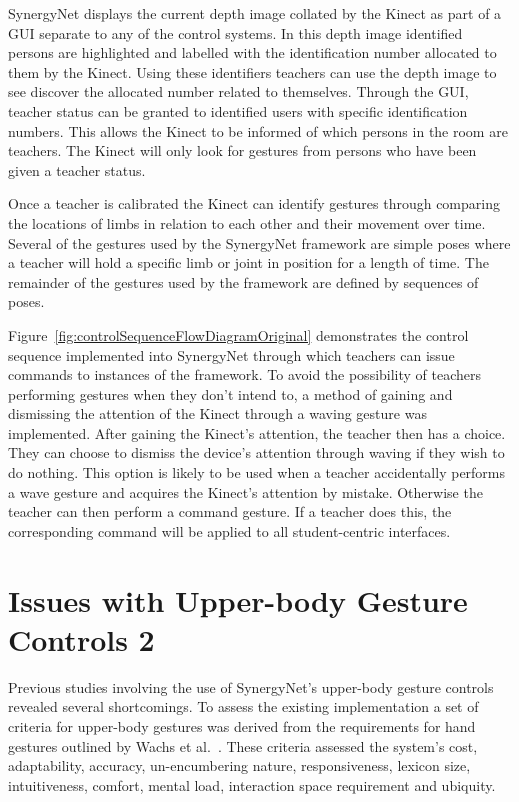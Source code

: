 \documentclass[manuscript, review, screen]{acmart}
\begin{document}
SynergyNet displays the current depth image collated by the Kinect as part of a GUI separate to any of the control systems.
In this depth image identified persons are highlighted and labelled with the identification number allocated to them by the Kinect.
Using these identifiers teachers can use the depth image to see discover the allocated number related to themselves.
Through the GUI, teacher status can be granted to identified users with specific identification numbers.
This allows the Kinect to be informed of which persons in the room are teachers.
The Kinect will only look for gestures from persons who have been given a teacher status.

Once a teacher is calibrated the Kinect can identify gestures through comparing the locations of limbs in relation to each other and their movement over time.
Several of the gestures used by the SynergyNet framework are simple poses where a teacher will hold a specific limb or joint in position for a length of time.
The remainder of the gestures used by the framework are defined by sequences of poses.

Figure~\ref{fig:controlSequenceFlowDiagramOriginal} demonstrates the control sequence implemented into SynergyNet through which teachers can issue commands to instances of the framework.
To avoid the possibility of teachers performing gestures when they don't intend to, a method of gaining and dismissing the attention of the Kinect through a waving gesture was implemented.
After gaining the Kinect's attention, the teacher then has a choice.
They can choose to dismiss the device's attention through waving if they wish to do nothing.
This option is likely to be used when a teacher accidentally performs a wave gesture and acquires the Kinect's attention by mistake.
Otherwise the teacher can then perform a command gesture.
If a teacher does this, the corresponding command will be applied to all student-centric interfaces.



\section{Issues with Upper-body Gesture Controls 2}  
\label{sec:issues2}



Previous studies involving the use of SynergyNet's upper-body gesture controls revealed several shortcomings.
To assess the existing implementation a set of criteria for upper-body gestures was derived from the requirements for hand gestures outlined by Wachs et al.~\cite{Wachs2011}.
These criteria assessed the system's cost, adaptability, accuracy, un-encumbering nature, responsiveness, lexicon size, intuitiveness, comfort, mental load, interaction space requirement and ubiquity.
\end{document}
